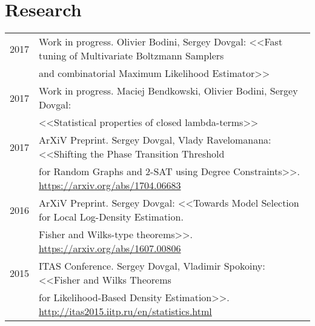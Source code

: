 \documentclass[a4paper,10pt]{article} %
\begin{document}
%
%
%
%

\vfill


\section{Research}
\begin{tabular}{rl}
2017 & Work in progress. Olivier Bodini, Sergey
     Dovgal: <<Fast tuning of Multivariate Boltzmann Samplers\\& and
combinatorial Maximum Likelihood Estimator>>\\
2017 & Work in progress. Maciej Bendkowski, Olivier Bodini, Sergey
     Dovgal:\\&
<<Statistical properties of closed lambda-terms>>\\
2017 & ArXiV Preprint. Sergey Dovgal, Vlady Ravelomanana:
 <<Shifting the Phase Transition Threshold\\& for Random Graphs and 2-SAT using
Degree Constraints>>. \url{https://arxiv.org/abs/1704.06683} \\
2016 & ArXiV Preprint. Sergey Dovgal:
 <<Towards Model Selection for Local Log-Density Estimation.\\& Fisher and Wilks-type theorems>>. \url{https://arxiv.org/abs/1607.00806} \\
2015 & ITAS Conference. Sergey Dovgal, Vladimir Spokoiny: 
 <<Fisher and Wilks Theorems\\& for Likelihood-Based Density Estimation>>.
\url{http://itas2015.iitp.ru/en/statistics.html}

\end{tabular}
\end{document}
